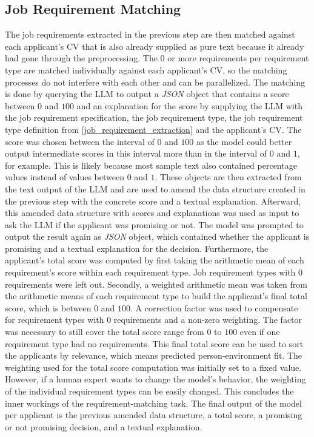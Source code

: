 \documentclass[draft,final]{thesisclass} %
\begin{document}
\subsection{Job Requirement Matching} \label{job_requirement_matching}
The job requirements extracted in the previous step are then matched against each applicant's \acs{CV} that is also already supplied as pure text because it already had gone through the preprocessing.
The $0$ or more requirements per requirement type are matched individually against each applicant's \acs{CV}, so the matching processes do not interfere with each other and can be parallelized.
The matching is done by querying the \gls{LLM} to output a \textit{JSON} object that contains a score between $0$ and $100$ and an explanation for the score by supplying the \gls{LLM} with the job requirement specification, the job requirement type, the job requirement type definition from \ref{job_requirement_extraction} and the applicant's \acs{CV}.
The score was chosen between the interval of $0$ and $100$ as the model could better output intermediate scores in this interval more than in the interval of $0$ and $1$, for example.
This is likely because most sample text also contained percentage values instead of values between $0$ and $1$.
These objects are then extracted from the text output of the \gls{LLM} and are used to amend the data structure created in the previous step with the concrete score and a textual explanation.
Afterward, this amended data structure with scores and explanations was used as input to ask the \gls{LLM} if the applicant was promising or not.
The model was prompted to output the result again as \textit{JSON} object, which contained whether the applicant is promising and a textual explanation for the decision.
Furthermore, the applicant's total score was computed by first taking the arithmetic mean of each requirement's score within each requirement type. Job requirement types with $0$ requirements were left out.
Secondly, a weighted arithmetic mean was taken from the arithmetic means of each requirement type to build the applicant's final total score, which is between $0$ and $100$.
A correction factor was used to compensate for requirement types with $0$ requirements and a non-zero weighting. The factor was necessary to still cover the total score range from $0$ to $100$ even if one requirement type had no requirements.
This final total score can be used to sort the applicants by relevance, which means predicted person-environment fit.
The weighting used for the total score computation was initially set to a fixed value. However, if a human expert wants to change the model's behavior, the weighting of the individual requirement types can be easily changed.
This concludes the inner workings of the requirement-matching task. The final output of the model per applicant is the previous amended data structure, a total score, a promising or not promising decision, and a textual explanation.
\end{document}
